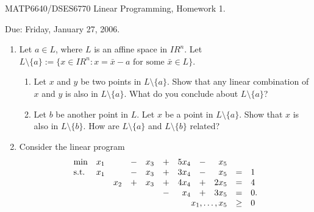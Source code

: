 \documentclass[11pt]{article}
\newcommand{\real}{I\!\! R}
\begin{document}
\begin{center}
  \begin{large}
     MATP6640/DSES6770 Linear Programming, Homework 1.
  \end{large}
\end{center}

\begin{flushright}
   Due:  Friday, January 27, 2006.
\end{flushright}

\vspace{\baselineskip}


\begin{enumerate}
  \item  Let $a\in L$, where $L$ is an affine space in $\real^n$.
         Let $L\setminus\{a\}:=
                \{x\in\real^n:x=\bar{x}-a\mbox{ for some } \bar{x} \in L\}$.
         \begin{enumerate}
           \item Let $x$ and $y$ be two points in $L\setminus\{a\}$.
             Show that any linear combination of $x$ and $y$ is also
             in $L\setminus\{a\}$.
             What do you conclude about $L\setminus\{a\}$?
           \item Let $b$ be another point in $L$.
             Let $x$ be a point in $L\setminus\{a\}$.
             Show that $x$ is also in $L\setminus\{b\}$.
             How are $L\setminus\{a\}$ and $L\setminus\{b\}$ related?
         \end{enumerate}
  \item  Consider the linear program
         \begin{displaymath}
          \begin{array}{lcccccrcrcl}
          \min & x_1 & &- & x_3 & + & 5x_4 & - & x_5 \\
                 \mbox{s.t.} &x_1  &       & - & x_3 & + & 3x_4  & - &  x_5 & = & 1  \\
                  &    &  x_2  & + & x_3 & + & 4x_4  & + & 2x_5 & = & 4  \\
                     & &       &   &     & - &  x_4  & + & 3x_5 & = & 0. \\
                     & \multicolumn{8}{r}{x_1,\ldots,x_5} & \geq & 0

\end{array}
\end{displaymath}
\end{enumerate}
\end{document}
